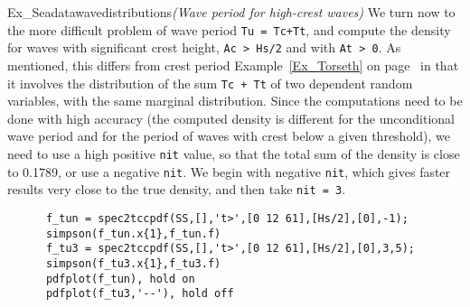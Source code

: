 \begin{cex}{Ex_Seadatawavedistributions}{\sl (Wave period for high-crest waves)}
We turn now to the more difficult problem of wave
period {\tt Tu = Tc+Tt}, and compute the density for 
waves with significant crest height, {\tt Ac > Hs/2} and
with {\tt At > 0}. As mentioned, this differs from crest period 
Example~\ref{Ex_Torseth} on page~\pageref{pageTorsethCrestPeriod} 
in that it involves the
distribution of the sum {\tt Tc + Tt} of two dependent random variables,
with the same marginal distribution. Since the computations need to be
done with high accuracy (the computed density is different for the
unconditional wave period and for the period of waves with crest below a given
threshold),  %
we need to use a high positive {\tt nit} value, so that the total sum
of the density is close to 0.1789, or use a negative {\tt nit}. 
We begin with negative {\tt nit}, which gives faster results
very close to the true density, and then take {\tt nit = 3}.
{\small\begin{verbatim}
      f_tun = spec2tccpdf(SS,[],'t>',[0 12 61],[Hs/2],[0],-1);
      simpson(f_tun.x{1},f_tun.f)
      f_tu3 = spec2tccpdf(SS,[],'t>',[0 12 61],[Hs/2],[0],3,5);
      simpson(f_tu3.x{1},f_tu3.f)
      pdfplot(f_tun), hold on
      pdfplot(f_tu3,'--'), hold off
\end{verbatim}}


\end{cex}
